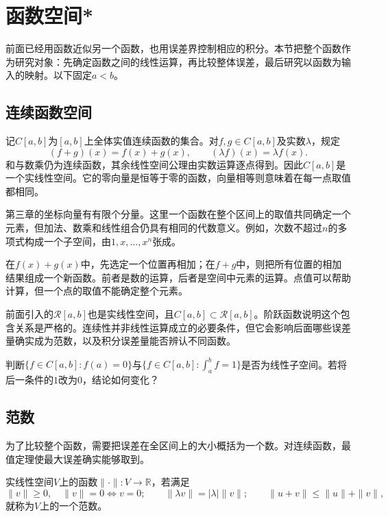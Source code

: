 \FloatBarrier
\newpage
\section{函数空间*}
\label{sec:calculus-function-spaces}

前面已经用函数近似另一个函数，也用误差界控制相应的积分。本节把整个函数作为研究对象：先确定函数之间的线性运算，再比较整体误差，最后研究以函数为输入的映射。以下固定\(a<b\)。

\subsection{连续函数空间}

记\(C[a,b]\)为\([a,b]\)上全体实值连续函数的集合。对\(f,g\in C[a,b]\)及实数\(\lambda\)，规定
\begin{equation*}
 (f+g)(x)=f(x)+g(x),\qquad(\lambda f)(x)=\lambda f(x).
\end{equation*}
和与数乘仍为连续函数，其余线性空间公理由实数运算逐点得到。因此\(C[a,b]\)是一个实线性空间。它的零向量是恒等于零的函数，向量相等则意味着在每一点取值都相同。

第三章的坐标向量有有限个分量。这里一个函数在整个区间上的取值共同确定一个元素，但加法、数乘和线性组合仍具有相同的代数意义。例如，次数不超过\(n\)的多项式构成一个子空间，由\(1,x,\ldots,x^n\)张成。

在\(f(x)+g(x)\)中，先选定一个位置再相加；在\(f+g\)中，则把所有位置的相加结果组成一个新函数。前者是数的运算，后者是空间中元素的运算。点值可以帮助计算，但一个点的取值不能确定整个元素。

前面引入的\(\mathcal R[a,b]\)也是实线性空间，且\(C[a,b]\subset\mathcal R[a,b]\)。阶跃函数说明这个包含关系是严格的。连续性并非线性运算成立的必要条件，但它会影响后面哪些误差量确实成为范数，以及积分误差量能否辨认不同函数。

\begin{example}
判断\(\{f\in C[a,b]:f(a)=0\}\)与\(\{f\in C[a,b]:\int_a^b f=1\}\)是否为线性子空间。若将后一条件的\(1\)改为\(0\)，结论如何变化？
\end{example}

\subsection{范数}

为了比较整个函数，需要把误差在全区间上的大小概括为一个数。对连续函数，最值定理使最大误差确实能够取到。

\begin{definition}
实线性空间\(V\)上的函数\(\|\cdot\|:V\to\mathbb R\)，若满足
\begin{equation*}
 \|v\|\ge0,\quad\|v\|=0\Longleftrightarrow v=0;\qquad
 \|\lambda v\|=|\lambda|\|v\|;\qquad
 \|u+v\|\le\|u\|+\|v\|,
\end{equation*}
就称为\(V\)上的一个{\heiti{}范数}。
\end{definition}

